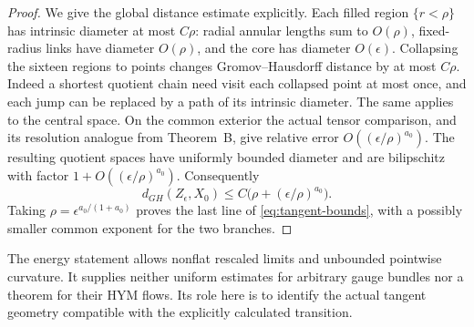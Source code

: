 \begin{proof}
We give the global distance estimate explicitly. Each filled region
$\{r<\rho\}$ has intrinsic diameter at most $C\rho$: radial annular
lengths sum to $O(\rho)$, fixed-radius links have diameter $O(\rho)$,
and the core has diameter $O(\epsilon)$. Collapsing the sixteen
regions to points changes Gromov--Hausdorff distance by at most
$C\rho$. Indeed a shortest quotient chain need visit each collapsed
point at most once, and each jump can be replaced by a path of its
intrinsic diameter. The same applies to the central space. On the
common exterior the actual tensor comparison, and its resolution
analogue from Theorem~B, give relative error $O((\epsilon/\rho)^{a_0})$.
The resulting quotient spaces have uniformly bounded diameter and
are bilipschitz with factor $1+O((\epsilon/\rho)^{a_0})$.
Consequently
\[
 d_{GH}(Z_\epsilon,X_0)\le C\bigl(\rho+(\epsilon/\rho)^{a_0}\bigr).
\]
Taking $\rho=\epsilon^{a_0/(1+a_0)}$ proves the last line of
\eqref{eq:tangent-bounds}, with a possibly smaller common exponent
for the two branches.
\end{proof}

The energy statement allows nonflat rescaled limits and unbounded
pointwise curvature. It supplies neither uniform estimates for arbitrary
gauge bundles nor a theorem for their HYM flows. Its role here is to
identify the actual tangent geometry compatible with the explicitly
calculated transition.

